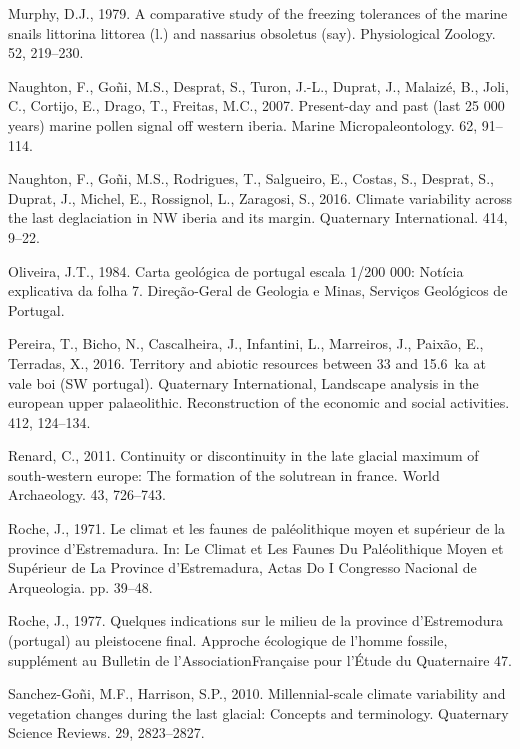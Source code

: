 \documentclass[12pt,twoside]{reedthesis}
\begin{document}
\leavevmode\hypertarget{ref-murphy1979}{}%
Murphy, D.J., 1979. A comparative study of the freezing tolerances of the marine snails littorina littorea (l.) and nassarius obsoletus (say). Physiological Zoology. 52, 219--230.

\leavevmode\hypertarget{ref-naughton2007}{}%
Naughton, F., Goñi, M.S., Desprat, S., Turon, J.-L., Duprat, J., Malaizé, B., Joli, C., Cortijo, E., Drago, T., Freitas, M.C., 2007. Present-day and past (last 25 000 years) marine pollen signal off western iberia. Marine Micropaleontology. 62, 91--114.

\leavevmode\hypertarget{ref-naughton2016}{}%
Naughton, F., Goñi, M.S., Rodrigues, T., Salgueiro, E., Costas, S., Desprat, S., Duprat, J., Michel, E., Rossignol, L., Zaragosi, S., 2016. Climate variability across the last deglaciation in NW iberia and its margin. Quaternary International. 414, 9--22.

\leavevmode\hypertarget{ref-oliveira1984}{}%
Oliveira, J.T., 1984. Carta geológica de portugal escala 1/200 000: Notícia explicativa da folha 7. Direção-Geral de Geologia e Minas, Serviços Geológicos de Portugal.

\leavevmode\hypertarget{ref-pereira2016}{}%
Pereira, T., Bicho, N., Cascalheira, J., Infantini, L., Marreiros, J., Paixão, E., Terradas, X., 2016. Territory and abiotic resources between 33 and 15.6~ka at vale boi (SW portugal). Quaternary International, Landscape analysis in the european upper palaeolithic. Reconstruction of the economic and social activities. 412, 124--134.

\leavevmode\hypertarget{ref-renard2011}{}%
Renard, C., 2011. Continuity or discontinuity in the late glacial maximum of south-western europe: The formation of the solutrean in france. World Archaeology. 43, 726--743.

\leavevmode\hypertarget{ref-roche1971}{}%
Roche, J., 1971. Le climat et les faunes de paléolithique moyen et supérieur de la province d'Estremadura. In: Le Climat et Les Faunes Du Paléolithique Moyen et Supérieur de La Province d'Estremadura, Actas Do I Congresso Nacional de Arqueologia. pp. 39--48.

\leavevmode\hypertarget{ref-roche1977}{}%
Roche, J., 1977. Quelques indications sur le milieu de la province d'Estremodura (portugal) au pleistocene final. Approche écologique de l'homme fossile, supplément au Bulletin de l'AssociationFrançaise pour l'Étude du Quaternaire 47.

\leavevmode\hypertarget{ref-sanchez-goni2010}{}%
Sanchez-Goñi, M.F., Harrison, S.P., 2010. Millennial-scale climate variability and vegetation changes during the last glacial: Concepts and terminology. Quaternary Science Reviews. 29, 2823--2827.
\end{document}
